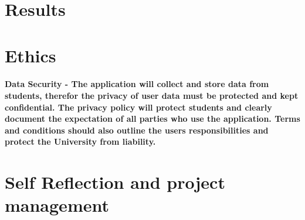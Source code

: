 \documentclass[12pt]{article}
\begin{document}
\section{Results}%


\paragragh{} 
\newpage

\section{Ethics } %

\paragraph {Data Security - The application will collect and store data from students, therefor the privacy of user data must be protected and kept confidential. The privacy policy will protect students and clearly document the expectation of all parties who use the application. Terms and conditions should also outline the users responsibilities and protect the University from liability.~\cite{Ladwig202050}}
\newpage

\section{Self Reflection and project management} %
\end{document}
